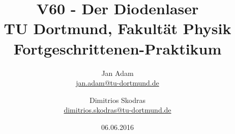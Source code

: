 



\title{V60 - Der Diodenlaser\\				%
	\large TU Dortmund, Fakultät Physik\\ 
	\normalsize Fortgeschrittenen-Praktikum}

\author{Jan Adam\\			%
	{\small \href{jan.adam@tu-dortmund.de}{jan.adam@tu-dortmund.de}}	%
	\and						%
	Dimitrios Skodras\\					%
	{\small \href{dimitrios.skodras@tu-dortmund.de}{dimitrios.skodras@tu-dortmund.de}}		%
}
\date{06.06.2016}				%



	

\maketitle					%
\thispagestyle{empty} 				%



\tableofcontents


\newpage					%


